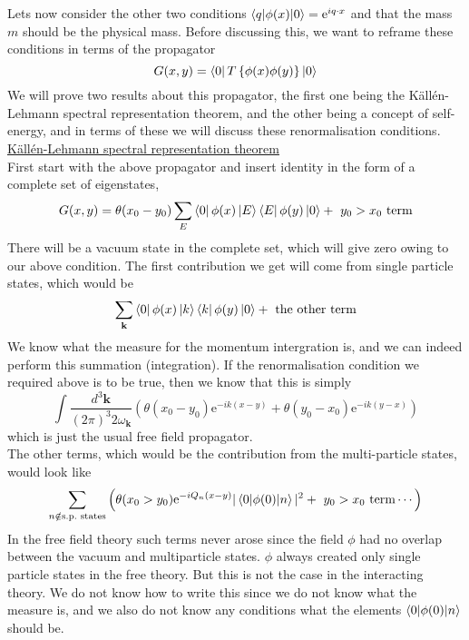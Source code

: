 \documentclass[11pt, notitlepage]{report}
\newcommand{\e}{\mathrm{e}}
\newcommand{\w}{\omega}
\numberwithin{equation}{section}
\begin{document}
Lets now consider the other two conditions \(\braket{q|\phi(x)|0} = \e^{iq\cdot x}\) and that the mass \(m\) should be the physical mass. 
Before discussing this, we want to reframe these conditions in terms of the propagator 
\begin{equation*}
    G(x,y) = \bra{0} T\left\{ \phi(x) \phi(y) \right\}\ket{0}
\end{equation*}
We will prove two results about this propagator, the first one being the K\"all\'en-Lehmann spectral representation theorem, and the other being a concept of self-energy, and in terms of these we will discuss these renormalisation conditions.\\

\underline{K\"all\'en-Lehmann spectral representation theorem}\\
First start with the above propagator and insert identity in the form of a complete set of eigenstates, 
\begin{equation*}
    G(x,y) = \theta(x_0-y_0)\sum_{E} \bra{0} \phi(x) \ket{E}\bra{E} \phi(y) \ket{0} + ~y_0>x_0\text{ term}
\end{equation*}
There will be a vacuum state in the complete set, which will give zero owing to our above condition. The first contribution we get will come from single particle states, which would be 
\begin{equation*}
    \sum_{\textbf{k}} \bra{0}\phi(x)\ket{{k}}\bra{{k}}\phi(y)\ket{0} + ~\text{the other term}
\end{equation*}
We know what the measure for the momentum intergration is, and we can indeed perform this summation (integration). If the renormalisation condition we required above is to be true, then we know that this is simply 
\begin{equation*}
    \int \frac{d^3\textbf{k}}{(2\pi)^3 2\w_\textbf{k}} \left( \theta(x_0 - y_0)\e^{-ik(x-y)} + \theta(y_0 - x_0)\e^{-ik(y-x)} \right)
\end{equation*}
which is just the usual free field propagator.\\
The other terms, which would be the contribution from the multi-particle states, would look like 
\begin{equation*}
    \sum_{n\notin \text{s.p.\ states}} \left( \theta(x_0>y_0) \e^{-iQ_n(x-y)}|\braket{0|\phi(0)|n}|^2  + ~y_0>x_0\text{~term}\cdots\right)
\end{equation*}
In the free field theory such terms never arose since the field \(\phi\) had no overlap between the vacuum and multiparticle states. \(\phi\) always created only single particle states in the free theory. But this is not the case in the interacting theory. We do not know how to write this since we do not know what the measure is, and we also do not know any conditions what the elements \(\braket{0|\phi(0)|n}\) should be.\\
\end{document}
